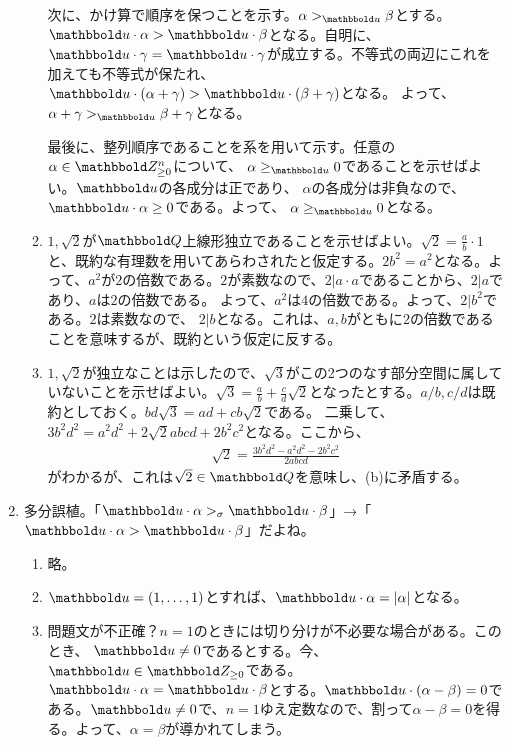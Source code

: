 \documentclass[9pt]{ltjsarticle}
\newcommand{\bbold}{\mathbbold}
\begin{document}
\begin{enumerate}[label=(問題\arabic*)]
\begin{enumerate}[label=(\alph*)]
   次に、かけ算で順序を保つことを示す。$\alpha >_{\bbold u} \beta$とする。
   $\bbold u\cdot \alpha > \bbold u\cdot \beta$となる。自明に、
   $\bbold u \cdot \gamma = \bbold u\cdot \gamma$が成立する。不等式の両辺にこれを加えても不等式が保たれ、$\bbold u\cdot (\alpha + \gamma ) > \bbold u\cdot (\beta +\gamma)$となる。
   よって、$\alpha + \gamma >_{\bbold u} \beta + \gamma$となる。

   最後に、整列順序であることを系を用いて示す。任意の$\alpha \in \Zge^n$について、
   $\alpha \ge_{\bbold u} 0$であることを示せばよい。$\bbold u$の各成分は正であり、
   $\alpha$の各成分は非負なので、$\bbold u\cdot \alpha \ge 0$である。よって、
   $\alpha \ge_{\bbold u} 0$となる。

   \item $1,\sqrt{2}$が$\Q$上線形独立であることを示せばよい。$\sqrt{2} = \frac{a}{b}\cdot 1$と、既約な有理数を用いてあらわされたと仮定する。$2b^2 = a^2$となる。よって、$a^2$が$2$の倍数である。$2$が素数なので、$2|a\cdot a$であることから、$2|a$であり、$a$は$2$の倍数である。
   よって、$a^2$は$4$の倍数である。よって、$2|b^2$である。$2$は素数なので、
   $2|b$となる。これは、$a,b$がともに$2$の倍数であることを意味するが、既約という仮定に反する。

   \item $1,\sqrt{2}$が独立なことは示したので、$\sqrt{3}$がこの2つのなす部分空間に属していないことを示せばよい。$\sqrt{3} = \frac{a}{b} + \frac{c}{d}\sqrt{2}$となったとする。$a/b,c/d$は既約としておく。$bd\sqrt{3} = ad + cb\sqrt{2}$である。
   二乗して、$3 b^2d^2 = a^2d^2 + 2\sqrt{2}abcd + 2b^2c^2$となる。ここから、
   \begin{align}
     \sqrt{2} = \frac{3b^2d^2 - a^2d^2 - 2b^2c^2}{2abcd}
   \end{align}
   がわかるが、これは$\sqrt{2} \in \Q$を意味し、(b)に矛盾する。
 \end{enumerate}
 \item
 多分誤植。「$\bbold u\cdot \alpha >_\sigma \bbold u\cdot \beta$」→「$\bbold u\cdot \alpha > \bbold u\cdot \beta$」だよね。
 \begin{enumerate}[label=(\alph*)]
   \item 略。
   \item $\bbold u = (1,\dots, 1)$とすれば、$\bbold u\cdot \alpha = \myabs{\alpha}$となる。
   \item 問題文が不正確？$n=1$のときには切り分けが不必要な場合がある。このとき、
   $\bbold u \neq 0$であるとする。今、$\bbold u \in \Zge$である。
   $\bbold u\cdot \alpha = \bbold u\cdot \beta$とする。$\bbold u\cdot (\alpha-\beta) = 0$である。$\bbold u \neq 0$で、$n=1$ゆえ定数なので、割って$\alpha -\beta = 0$を得る。よって、$\alpha = \beta$が導かれてしまう。


\end{enumerate}
\end{enumerate}
\end{document}
